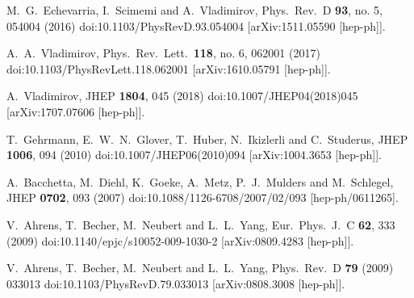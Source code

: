 \documentclass[prd,nofootinbib,eqsecnum,final]{revtex4}
\renewcommand{\(}{\left(}
\renewcommand{\)}{\right)}
\renewcommand{\[}{\left[}
\renewcommand{\]}{\right]}
\begin{document}
\begin{thebibliography}{10}
  M.~G.~Echevarria, I.~Scimemi and A.~Vladimirov,
  Phys.\ Rev.\ D {\bf 93}, no. 5, 054004 (2016)
  doi:10.1103/PhysRevD.93.054004
  [arXiv:1511.05590 [hep-ph]].
  
  A.~A.~Vladimirov,
  Phys.\ Rev.\ Lett.\  {\bf 118}, no. 6, 062001 (2017)
  doi:10.1103/PhysRevLett.118.062001
  [arXiv:1610.05791 [hep-ph]].
  
  A.~Vladimirov,
  JHEP {\bf 1804}, 045 (2018)
  doi:10.1007/JHEP04(2018)045
  [arXiv:1707.07606 [hep-ph]].
  
  T.~Gehrmann, E.~W.~N.~Glover, T.~Huber, N.~Ikizlerli and C.~Studerus,
  JHEP {\bf 1006}, 094 (2010)
  doi:10.1007/JHEP06(2010)094
  [arXiv:1004.3653 [hep-ph]].
  
  A.~Bacchetta, M.~Diehl, K.~Goeke, A.~Metz, P.~J.~Mulders and M.~Schlegel,
  JHEP {\bf 0702}, 093 (2007)
  doi:10.1088/1126-6708/2007/02/093
  [hep-ph/0611265].
  
  V.~Ahrens, T.~Becher, M.~Neubert and L.~L.~Yang,
  Eur.\ Phys.\ J.\ C {\bf 62}, 333 (2009)
  doi:10.1140/epjc/s10052-009-1030-2
  [arXiv:0809.4283 [hep-ph]].

  V.~Ahrens, T.~Becher, M.~Neubert and L.~L.~Yang,
  Phys.\ Rev.\ D {\bf 79} (2009) 033013
  doi:10.1103/PhysRevD.79.033013
  [arXiv:0808.3008 [hep-ph]].
  

\end{thebibliography}
\end{document}
